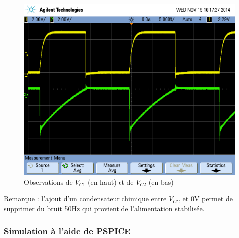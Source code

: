 \documentclass[../../Cours_M1.tex]{subfiles}
\begin{document}
\begin{figure}[h!]
\center
\includegraphics[scale=0.3]{AATC/I1osc.PNG}
\caption{Observations de $V_{C1}$ (en haut) et de $V_{C2}$ (en bas)}
\end{figure}

\noindent Remarque : l'ajout d'un condensateur chimique entre $V_{CC}$ et 0V permet de supprimer du bruit 50Hz qui provient de l'alimentation stabilisée.

\subsubsection*{Simulation à l'aide de PSPICE}
\end{document}
